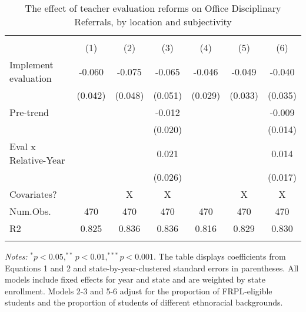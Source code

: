 \begin{table}

\caption{The effect of teacher evaluation reforms on Office Disciplinary Referrals, by location and subjectivity \label{tab:mainDD}}
\centering
\begin{threeparttable}
\begin{tabular}[t]{lcccccc}
\hline\hline \\[-1.8ex]
  & (1) & (2) & (3) & (4) & (5) & (6)\\
\midrule
Implement evaluation & -0.060 & -0.075 & -0.065 & -0.046 & -0.049 & -0.040\\
 & (0.042) & (0.048) & (0.051) & (0.029) & (0.033) & (0.035)\\
Pre-trend &  &  & -0.012 &  &  & -0.009\\
 &  &  & (0.020) &  &  & (0.014)\\
Eval x Relative-Year &  &  & 0.021 &  &  & 0.014\\
 &  &  & (0.026) &  &  & (0.017)\\
\midrule
Covariates? &  & X & X &  & X & X\\
Num.Obs. & 470 & 470 & 470 & 470 & 470 & 470\\
R2 & 0.825 & 0.836 & 0.836 & 0.816 & 0.829 & 0.830\\
\hline\hline \\[-1.8ex]
\end{tabular}
\begin{tablenotes}
\item \small \textit{Notes:} $^{*}p<0.05, ^{**}p<0.01, ^{***}p<0.001$. The table displays coefficients from Equations 1 and 2 and state-by-year-clustered standard errors in parentheses. All models include fixed effects for year and state and are weighted by state enrollment. Models 2-3 and 5-6 adjust for the proportion of FRPL-eligible students and the proportion of students of different ethnoracial backgrounds.
\end{tablenotes}
\end{threeparttable}
\end{table}
